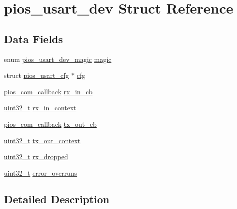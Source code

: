 \hypertarget{structpios__usart__dev}{\section{pios\-\_\-usart\-\_\-dev Struct Reference}
\label{structpios__usart__dev}
}
\subsection*{Data Fields}
\begin{DoxyCompactItemize}
\item 
enum \hyperlink{group___p_i_o_s___u_s_a_r_t_gabc5ff4f4da76683608f4140d4e343a32}{pios\-\_\-usart\-\_\-dev\-\_\-magic} \hyperlink{structpios__usart__dev_a687addd5d60a08b8e9f1387f3c82e8a8}{magic}
\item 
struct \hyperlink{structpios__usart__cfg}{pios\-\_\-usart\-\_\-cfg} $\ast$ \hyperlink{structpios__usart__dev_a33767fade40ae8e9eca5f70ee46ab5e0}{cfg}
\item 
\hyperlink{group___p_i_o_s___c_o_m_ga23f1888821f1f74a50c02adc459df597}{pios\-\_\-com\-\_\-callback} \hyperlink{structpios__usart__dev_a604c1d7dbae9c36025b38ac556734cad}{rx\-\_\-in\-\_\-cb}
\item 
\hyperlink{stdint_8h_a435d1572bf3f880d55459d9805097f62}{uint32\-\_\-t} \hyperlink{structpios__usart__dev_ab2a4099b0c4ff51081a4aaf5997979e5}{rx\-\_\-in\-\_\-context}
\item 
\hyperlink{group___p_i_o_s___c_o_m_ga23f1888821f1f74a50c02adc459df597}{pios\-\_\-com\-\_\-callback} \hyperlink{structpios__usart__dev_a492ccd307ef7d05febd54d4747028125}{tx\-\_\-out\-\_\-cb}
\item 
\hyperlink{stdint_8h_a435d1572bf3f880d55459d9805097f62}{uint32\-\_\-t} \hyperlink{structpios__usart__dev_af77f59770d9584ab03c1393ee5e937fa}{tx\-\_\-out\-\_\-context}
\item 
\hyperlink{stdint_8h_a435d1572bf3f880d55459d9805097f62}{uint32\-\_\-t} \hyperlink{structpios__usart__dev_afe1832deba4f05c2cb5c33a0f397caa5}{rx\-\_\-dropped}
\item 
\hyperlink{stdint_8h_a435d1572bf3f880d55459d9805097f62}{uint32\-\_\-t} \hyperlink{structpios__usart__dev_a39136a16dedc7d092749a2c36ef899c5}{error\-\_\-overruns}
\end{DoxyCompactItemize}


\subsection{Detailed Description}


